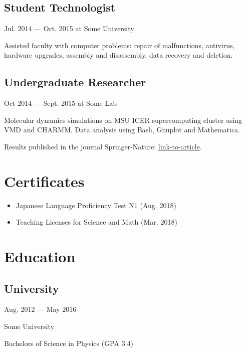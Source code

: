 \documentclass[letterpaper]{easyCV}
\begin{document}
\begin{main}[10pt]
\subsection{Student Technologist}{Jul. 2014 --- 
Oct. 2015 at Some University}
    \begin{mainlist}
        \item Assisted faculty with computer problems:
            repair of malfunctions, antivirus, hardware
            upgrades, assembly and disassembly, data
            recovery and deletion. 
    \end{mainlist}

\subsection{Undergraduate Researcher}{Oct 2014 ---
Sept. 2015 at Some Lab}
    \begin{mainlist}
        \item Molecular dynamics simulations on MSU 
            ICER supercomputing cluster using VMD and
            CHARMM. Data analysis using Bash, Gnuplot
            and Mathematica.
        \item Results published in the 
            journal Springer-Nature: 
            \href{link-to-article}
            {link-to-article}.
    \end{mainlist}

\section{Certificates}
\begin{itemize}
    \item Japanese Language Proficiency Test N1
        (Aug. 2018)
    \item Teaching Licenses for 
        Science and Math (Mar. 2018)
\end{itemize}


\section{Education}
\subsection{University}{Aug. 2012 --- May 2016}
    \begin{mainlist}
        \item Some University
        \item Bachelors of Science in Physics (GPA 3.4)
    \end{mainlist}

\end{main}

\footer
\end{document}
